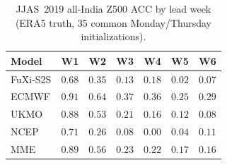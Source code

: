 \begin{table}[t]
  \centering
  \caption{JJAS~2019 all-India Z500 ACC by lead week (ERA5 truth, 35 common Monday/Thursday initializations).}
  \label{tab:jjas_acc_z500}
  \small
  \begin{tabular}{lcccccc}
    \toprule
    Model & W1 & W2 & W3 & W4 & W5 & W6 \\
    \midrule
    FuXi-S2S       & $0.68$ & $0.35$ & $0.13$ & $0.18$ & $0.02$ & $0.07$ \\
ECMWF          & $\mathbf{0.91}$ & $\mathbf{0.64}$ & $\mathbf{0.37}$ & $\mathbf{0.36}$ & $\mathbf{0.25}$ & $\mathbf{0.29}$ \\
UKMO           & $0.88$ & $0.53$ & $0.21$ & $0.16$ & $0.12$ & $0.08$ \\
NCEP           & $0.71$ & $0.26$ & $0.08$ & $0.00$ & $0.04$ & $0.11$ \\
MME            & $0.89$ & $0.56$ & $0.23$ & $0.22$ & $0.17$ & $0.16$ \\
    \bottomrule
  \end{tabular}
\end{table}
